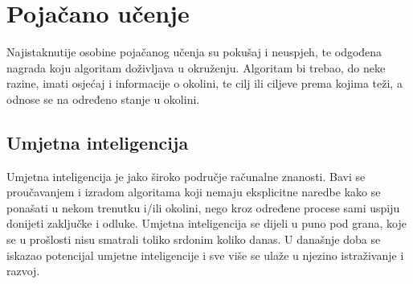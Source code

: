 \section{Pojačano učenje}
Najistaknutije osobine pojačanog učenja su pokušaj i neuspjeh, te odgođena nagrada koju algoritam doživljava u okruženju. Algoritam bi trebao, do neke razine, imati osjećaj i informacije o okolini, te cilj ili ciljeve prema kojima teži, a odnose se na određeno stanje u okolini.

\subsection{Umjetna inteligencija}
Umjetna inteligencija je jako široko područje računalne znanosti. Bavi se proučavanjem i izradom algoritama koji nemaju eksplicitne naredbe kako se ponašati u nekom trenutku i/ili okolini, nego kroz određene procese sami uspiju donijeti zaključke i odluke. Umjetna inteligencija se dijeli u puno pod grana, koje se u prošlosti nisu smatrali toliko srdonim koliko danas. U današnje doba se iskazao potencijal umjetne inteligencije i sve više se ulaže u njezino istraživanje i razvoj. 

